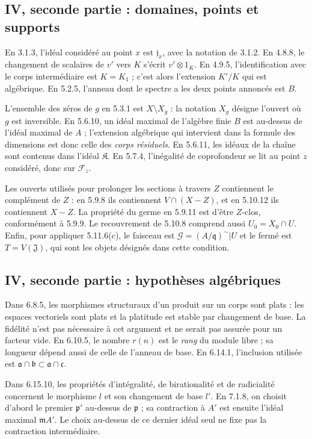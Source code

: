 \documentclass[11pt,a4paper]{article}
\begin{document}
\subsection{IV, seconde partie : domaines, points et supports}
\label{note:iv2-domains}
En 3.1.3, l'idéal considéré au point $x$ est $\mathfrak j_x$, avec la
notation de 3.1.2. En 4.8.8, le changement de scalaires de $v'$ vers
$K$ s'écrit $v'\otimes1_K$. En 4.9.5, l'identification avec le corps
intermédiaire est $K=K_1$ ; c'est alors l'extension $K'/K$ qui est
algébrique. En 5.2.5, l'anneau dont le spectre a les deux points annoncés
est $B$.

L'ensemble des zéros de $g$ en 5.3.1 est $X\setminus X_g$ : la notation
$X_g$ désigne l'ouvert où $g$ est inversible. En 5.6.10, un idéal maximal
de l'algèbre finie $B$ est au-dessus de l'idéal maximal de $A$ ; l'extension
algébrique qui intervient dans la formule des dimensions est donc celle
des \emph{corps résiduels}. En 5.6.11, les idéaux de la chaîne sont contenus
dans l'idéal $\mathfrak K$. En 5.7.4, l'inégalité de coprofondeur se lit
au point $z$ considéré, donc sur $\mathscr F_z$.

Les ouverts utilisés pour prolonger les sections à travers $Z$ contiennent
le complément de $Z$ : en 5.9.8 ils contiennent $V\cap(X-Z)$, et en 5.10.12
ils contiennent $X-Z$. La propriété du germe en 5.9.11 est d'être
$Z$-clos, conformément à 5.9.9. Le recouvrement de 5.10.8 comprend aussi
$U_0=X_0\cap U$. Enfin, pour appliquer 5.11.6(c), le faisceau est
$\mathcal G=(A/\mathfrak q)^\sim|U$ et le fermé est $T=V(\mathfrak J)$,
qui sont les objets désignés dans cette condition.

\subsection{IV, seconde partie : hypothèses algébriques}
\label{note:iv2-flatness}
Dans 6.8.5, les morphismes structuraux d'un produit sur un corps sont
plats : les espaces vectoriels sont plats et la platitude est stable par
changement de base. La fidélité n'est pas nécessaire à cet argument et
ne serait pas assurée pour un facteur vide. En 6.10.5, le nombre $r(n)$
est le \emph{rang} du module libre ; sa longueur dépend aussi de celle
de l'anneau de base. En 6.14.1, l'inclusion utilisée est
$\mathfrak a\cap\mathfrak b\subset\mathfrak a\cap\mathfrak c$.

Dans 6.15.10, les propriétés d'intégralité, de birationalité et de
radicialité concernent le morphisme $l$ et son changement de base $l'$.
En 7.1.8, on choisit d'abord le premier $\mathfrak p'$ au-dessus de
$\mathfrak p$ ; sa contraction à $A'$ est ensuite l'idéal maximal
$\mathfrak mA'$. Le choix au-dessus de ce dernier idéal seul ne fixe pas
la contraction intermédiaire.
\end{document}
